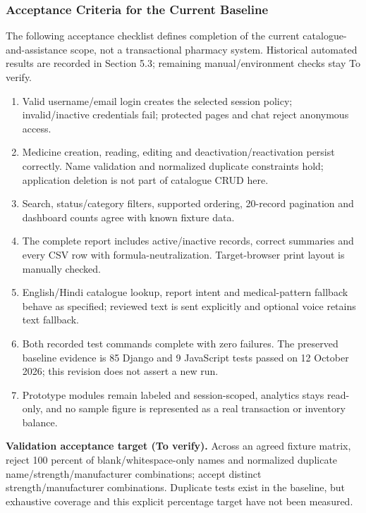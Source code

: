\subsubsection{Acceptance Criteria for the Current Baseline}
The following acceptance checklist defines completion of the current catalogue-and-assistance scope, not a transactional pharmacy system. Historical automated results are recorded in Section 5.3; remaining manual/environment checks stay To verify.
\begin{enumerate}
\item Valid username/email login creates the selected session policy; invalid/inactive credentials fail; protected pages and chat reject anonymous access.
\item Medicine creation, reading, editing and deactivation/reactivation persist correctly. Name validation and normalized duplicate constraints hold; application deletion is not part of catalogue CRUD here.
\item Search, status/category filters, supported ordering, 20-record pagination and dashboard counts agree with known fixture data.
\item The complete report includes active/inactive records, correct summaries and every CSV row with formula-neutralization. Target-browser print layout is manually checked.
\item English/Hindi catalogue lookup, report intent and medical-pattern fallback behave as specified; reviewed text is sent explicitly and optional voice retains text fallback.
\item Both recorded test commands complete with zero failures. The preserved baseline evidence is 85 Django and 9 JavaScript tests passed on 12 October 2026; this revision does not assert a new run.
\item Prototype modules remain labeled and session-scoped, analytics stays read-only, and no sample figure is represented as a real transaction or inventory balance.
\end{enumerate}
\textbf{Validation acceptance target (To verify).} Across an agreed fixture matrix, reject 100 percent of blank/whitespace-only names and normalized duplicate name/strength/manufacturer combinations; accept distinct strength/manufacturer combinations. Duplicate tests exist in the baseline, but exhaustive coverage and this explicit percentage target have not been measured.

